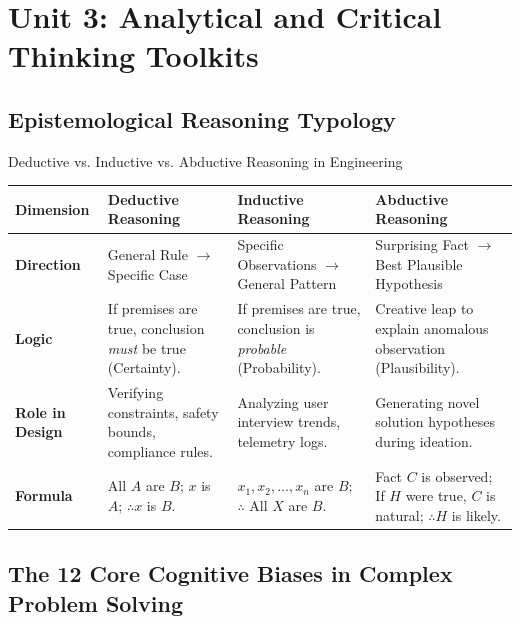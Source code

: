 \chapter{Unit 3: Analytical and Critical Thinking Toolkits}
\label{chap:unit3-analytical-toolkit}

\section{Epistemological Reasoning Typology}

\begin{frameworkbox}{Deductive vs. Inductive vs. Abductive Reasoning in Engineering}
\begin{tabularx}{\linewidth}{|l|X|X|X|} \hline
\textbf{Dimension} & \textbf{Deductive Reasoning} & \textbf{Inductive Reasoning} & \textbf{Abductive Reasoning} \\ \hline
\textbf{Direction} & General Rule $\to$ Specific Case & Specific Observations $\to$ General Pattern & Surprising Fact $\to$ Best Plausible Hypothesis \\ \hline
\textbf{Logic} & If premises are true, conclusion \textit{must} be true (Certainty). & If premises are true, conclusion is \textit{probable} (Probability). & Creative leap to explain anomalous observation (Plausibility). \\ \hline
\textbf{Role in Design} & Verifying constraints, safety bounds, compliance rules. & Analyzing user interview trends, telemetry logs. & Generating novel solution hypotheses during ideation. \\ \hline
\textbf{Formula} & All $A$ are $B$; $x$ is $A$; $\therefore x$ is $B$. & $x_1, x_2, \dots, x_n$ are $B$; $\therefore$ All $X$ are $B$. & Fact $C$ is observed; If $H$ were true, $C$ is natural; $\therefore H$ is likely. \\ \hline
\end{tabularx}
\end{frameworkbox}

\section{The 12 Core Cognitive Biases in Complex Problem Solving}

